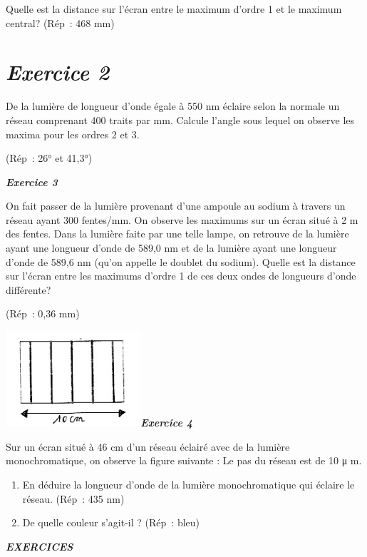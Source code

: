 Quelle est la distance sur l'écran entre le maximum d'ordre 1 et le
maximum central? (Rép~: 468 mm)

\hypertarget{exercice-2}{%
\section{\texorpdfstring{\emph{Exercice
2}}{Exercice 2}}\label{exercice-2}}

De la lumière de longueur d'onde égale à 550 nm éclaire selon la normale
un réseau comprenant 400 traits par mm. Calcule l'angle sous lequel on
observe les maxima pour les ordres 2 et 3.

(Rép~: 26° et 41,3°)

\emph{\textbf{Exercice 3}}

On fait passer de la lumière provenant d'une ampoule au sodium à travers
un réseau ayant 300 fentes/mm. On observe les maximums sur un écran
situé à 2 m des fentes. Dans la lumière faite par une telle lampe, on
retrouve de la lumière ayant une longueur d'onde de 589,0 nm et de la
lumière ayant une longueur d'onde de 589,6 nm (qu'on appelle le doublet
du sodium). Quelle est la distance sur l'écran entre les maximums
d'ordre 1 de ces deux ondes de longueurs d'onde différente?

(Rép~: 0,36 mm)

\includegraphics[width=5.008cm,height=3.551cm]{Pictures/10000001000000C70000008D88834268E2E16F18.png}\emph{\textbf{Exercice
4}}

Sur un écran situé à 46 cm d'un réseau éclairé avec de la lumière
monochromatique, on observe la figure suivante : Le pas du réseau est de
10 μ m.

\begin{enumerate}
\def\labelenumi{\alph{enumi})}
\tightlist
\item
  En déduire la longueur d'onde de la lumière monochromatique qui
  éclaire le réseau. (Rép~: 435 nm)
\item
  De quelle couleur s'agit-il ? (Rép~: bleu)
\end{enumerate}

\emph{\textbf{EXERCICES}}


